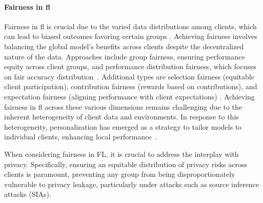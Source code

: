 \paragraph{\textbf{Fairness in \ac{fl}}}
Fairness in \ac{fl} is crucial due to the varied data distributions among clients, which can lead to biased outcomes favoring certain groups \cite{BG_Fairness_2}. Achieving fairness involves balancing the global model's benefits across clients despite the decentralized nature of the data. Approaches include group fairness, ensuring performance equity across client groups, and performance distribution fairness, which focuses on fair accuracy distribution~\cite{selialia2024mitigating}. Additional types are selection fairness (equitable client participation), contribution fairness (rewards based on contributions), and expectation fairness (aligning performance with client expectations) \cite{BG_Fairness}. Achieving fairness in \ac{fl} across these various dimensions remains challenging due to the inherent heterogeneity of client data and environments. In response to this heterogeneity, personalization has emerged as a strategy to tailor models to individual clients, enhancing local performance~\cite{BG_Personalization,BG_Personalization_2, BG_FairnessPrivacy}.   

When considering fairness in FL, it is crucial to address the interplay with privacy. Specifically, ensuring an equitable distribution of privacy risks across clients is paramount, preventing any group from being disproportionately vulnerable to privacy leakage, particularly under attacks such as source inference attacks (SIAs).